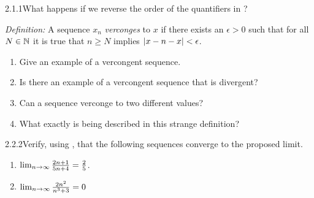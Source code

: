 \begin{exercise}
    {2.1.1}What happens if we reverse the order of the quantifiers in ?

    \textit{Definition:} A sequence \(x_{n}\) \textit{verconges} to \(x\) if there exists an \(\epsilon >0\) such that for all \(N \in \mathbb{N}\) it is true that \(n \geq N\) implies \(\left|x-n - x\right| < \epsilon \).
    \begin{enumerate}
        \item Give an example of a vercongent sequence.
        \item Is there an example of a vercongent sequence that is divergent?
        \item Can a sequence verconge to two different values?
        \item What exactly is being described in this strange definition?
    \end{enumerate}
\end{exercise}


\begin{exercise}
    {2.2.2}Verify, using , that
    the following sequences converge to the proposed limit.
    \begin{enumerate}
        \item \(\lim_{n \rightarrow \infty} \frac{2n + 1}{5n + 4} = \frac{2}{5}\).
        \item \(\lim_{n \rightarrow \infty} \frac{2n^2}{n^3+3} = 0\)
    \end{enumerate}
\end{exercise}

